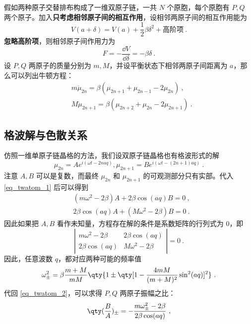
假如两种原子交替排布构成了一维双原子链，一共 $N$ 个原胞，每个原胞有 $P,Q$ 两个原子。加入\textbf{只考虑相邻原子间的相互作用}，设相邻两原子间的相互作用能为
\begin{equation}
V(a+\delta)=V(a)+\frac{1}{2}\beta \delta^2+\text{高阶项}~.
\end{equation}
\textbf{忽略高阶项}，则相邻原子间作用力为
\begin{equation}
F=-\frac{\dd V}{\dd \delta}=-\beta \delta~.
\end{equation}
设 $P,Q$ 两原子的质量分别为 $m,M$，并设平衡状态下相邻两原子间距离为 $a$，那么可以列出牛顿方程：
\begin{equation}\label{eq_twatom_1}
\begin{aligned}
&m\ddot \mu_{2n}=\beta(\mu_{2n+1}+\mu_{2n-1}-2\mu_{2n})~,\\
&M\ddot \mu_{2n+1}=\beta(\mu_{2n+2}+\mu_{2n}-2\mu_{2n+1})~.
\end{aligned}
\end{equation}

\subsection{格波解与色散关系}
仿照一维单原子链晶格的方法，我们设双原子链晶格也有格波形式的解
\begin{equation}\label{eq_twatom_3}
\mu_{2n}=A e^{i(\omega t - 2naq)},\mu_{2n+1}=B  e^{i(\omega t - (2n+1)aq)}~.
\end{equation}
注意 $A,B$ 可以是复数，而最终 $\mu_{2n}$ 和 $\mu_{2n+1}$ 的可观测部分只有实部。代入\autoref{eq_twatom_1} 后可以得到
\begin{equation}\label{eq_twatom_2}
\begin{aligned}
&(m\omega^2-2\beta)A+2\beta\cos(aq)B=0~,\\
&2\beta\cos(aq)A+(M\omega^2-2\beta)B=0~.
\end{aligned}
\end{equation}
因此如果把 $A,B$ 看作未知量，方程存在解的条件是系数矩阵的行列式为 $0$，即
\begin{equation}
\left|
\begin{matrix}
m\omega^2-2\beta&2\beta\cos(aq)\\
2\beta\cos(aq)&M\omega^2-2\beta
\end{matrix}
\right|=0~.
\end{equation}
因此，任意波数 $q$，都对应两种可能的频率值
\begin{equation}
\omega_{\pm}^2=\beta\frac{m+M}{mM}\qty{1\pm \qty[1-\frac{4mM}{(m+M)^2}\sin^2(aq)]^2}~.
\end{equation}
代回 \autoref{eq_twatom_2}，可以求得 $P,Q$ 两原子振幅之比：
\begin{equation}\label{eq_twatom_4}
\qty(\frac{B}{A})_{\pm}=-\frac{m\omega_{\pm}^2-2\beta}{2\beta\cos(aq)}~,
\end{equation}

